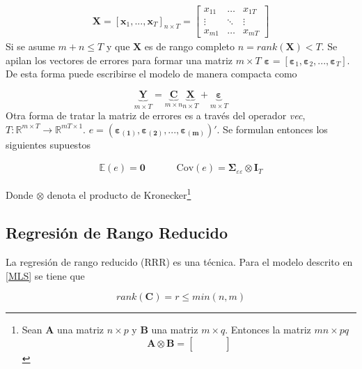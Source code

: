 \documentclass[12pt, twoside]{book}\usepackage[]{graphicx}\usepackage[]{color}
\let\bold\boldsymbol
\let\bf\mathbf
\numberwithin{equation}{section}
\numberwithin{theorem}{section}
\numberwithin{teorema}{section}
\numberwithin{defi}{section}
\numberwithin{prop}{section}
\numberwithin{defi}{section}
\theoremstyle{plain}
\begin{document}
\begin{align}
\bf{X} = \left[\bf{x}_{1},...,\bf{x}_{T} \right]_{n\times T} = \left[
\begin{array}{ccc} 
x_{11} & \hdots & x_{1T} \\ 
\vdots & \ddots & \vdots \\ 
x_{m1} & \hdots & x_{mT}
\end{array}\right] 
\end{align}
Si se asume $m+n\leq T$ y que $\bf{X}$ es de rango completo $n=rank(\bf{X})<T$. Se apilan los vectores de errores para formar una matriz $m\times T$ 
$\boldsymbol{\varepsilon} = [\boldsymbol{\varepsilon}_{1},\boldsymbol{\varepsilon}_{2},...,\boldsymbol{\varepsilon}_{T}]$. De esta forma puede escribirse el modelo de manera compacta como

\begin{equation}
\underbrace{\bf{Y}}_{m\times T}=\underbrace{\bf{C}}_{m\times n}\underbrace{\bf{X}}_{n\times T}+\underbrace{\boldsymbol{\varepsilon}}_{m\times T}
\end{equation}
Otra forma de tratar la matriz de errores es a través del operador \textit{vec}, $T: \mathbb{R}^{m\times T}\rightarrow \mathbb{R}^{mT\times 1}$.
$e = (\boldsymbol{\varepsilon_{(1)}}, \boldsymbol{\varepsilon_{(2)}}, ..., \boldsymbol{\varepsilon_{(m)}})'$. Se formulan entonces los siguientes supuestos 

\begin{align}
\mathbb{E}(e) = \bf{0} && && \text{Cov}(e) = \bold{\Sigma}_{\varepsilon\varepsilon} \otimes \bf{I}_{T}
\end{align}


Donde $\otimes$ denota el producto de Kronecker\footnote{Sean $\bf{A}$ una matriz $n\times p$ y $\bf{B}$ una matriz $m\times q$. Entonces la matriz $mn\times pq$
\begin{equation}
\bf{A}\otimes \bf{B} = \left[
\begin{array}{cccc}
& & & \\
& & & \\ 
& & & 
\end{array}\right]
\end{equation}
}
\subsection{Regresión de Rango Reducido}
La regresión de rango reducido (RRR) es una técnica. Para el modelo descrito en  \eqref{MLS} se tiene que 

\begin{equation}
rank(\bf{C}) = r\leq min(n,m)
\end{equation}
\end{document}
